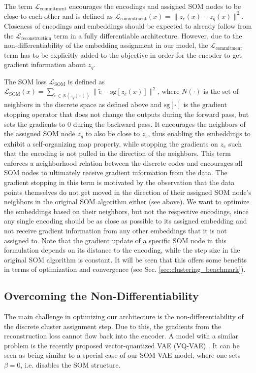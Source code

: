 The term $\mathcal{L}_{\text{commitment}}$ encourages the encodings and assigned SOM nodes to be close to each other and is defined as $\mathcal{L}_{\text{commitment}}(x) = \| z_e(x) - z_q(x) \|^2$.
Closeness of encodings and embeddings should be expected to already follow from the $\mathcal{L}_{\text{reconstruction}}$ term in a fully differentiable architecture.
However, due to the non-differentiability of the embedding assignment in our model, the $\mathcal{L}_{\text{commitment}}$ term has to be explicitly added to the objective in order for the encoder to get gradient information about $z_q$.

The SOM loss $\mathcal{L}_{\text{SOM}}$ is defined as $\mathcal{L}_{\text{SOM}}(x) = \sum_{\tilde{e} \in N(z_q(x))} \| \tilde{e} - \text{sg}[z_e(x)] \|^2$, where $N(\cdot)$ is the set of neighbors in the discrete space as defined above and $\text{sg}[\cdot]$ is the gradient stopping operator that does not change the outputs during the forward pass, but sets the gradients to 0 during the backward pass.
It encourages the neighbors of the assigned SOM node $z_q$ to also be close to $z_e$, thus enabling the embeddings to exhibit a self-organizing map property, while stopping the gradients on $z_e$ such that the encoding is not pulled in the direction of the neighbors.
This term enforces a neighborhood relation between the discrete codes and encourages all SOM nodes to ultimately receive gradient information from the data.
The gradient stopping in this term is motivated by the observation that the data points themselves do not get moved in the direction of their assigned SOM node's neighbors in the original SOM algorithm either (see above).
We want to optimize the embeddings based on their neighbors, but not the respective encodings, since any single encoding should be as close as possible to its assigned embedding and not receive gradient information from any other embeddings that it is not assigned to.
Note that the gradient update of a specific SOM node in this formulation depends on its distance to the encoding, while the step size in the original SOM algorithm is constant.
It will be seen that this offers some benefits in terms of optimization and convergence (see Sec. \ref{sec:clustering_benchmark}).


\subsection{Overcoming the Non-Differentiability}\label{sec:non-differentiability}

The main challenge in optimizing our architecture is the non-differentiability of the discrete cluster assignment step.
Due to this, the gradients from the reconstruction loss cannot flow back into the encoder.
A model with a similar problem is the recently proposed vector-quantized VAE (VQ-VAE) \citep{Oord2017}.
It can be seen as being similar to a special case of our SOM-VAE model, where one sets $\beta = 0$, i.e. disables the SOM structure.

